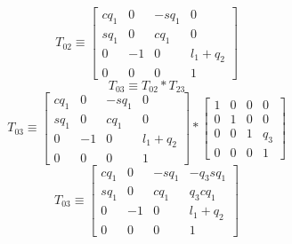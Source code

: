 \documentclass[12pt]{article}
\newcommand{\trans}[3]{\begin{bmatrix} 1 & 0 & 0 & #1 \\ 0 & 1 & 0 & #2 \\ 0 & 0 & 1 & #3 \\ 0 & 0 & 0 & 1 \end{bmatrix}}
\begin{document}
\[
  T_{02} \equiv
  \begin{bmatrix}
    cq_1 & 0 & -sq_1 & 0 \\
    sq_1 & 0 & cq_1 & 0 \\
    0 & -1 & 0 & l_1 + q_2 \\
    0 & 0 & 0 & 1
  \end{bmatrix}
\]
\[
  T_{03} \equiv T_{02} * T_{23}
\]
\[
  T_{03} \equiv
  \begin{bmatrix}
    cq_1 & 0 & -sq_1 & 0 \\
    sq_1 & 0 & cq_1 & 0 \\
    0 & -1 & 0 & l_1 + q_2 \\
    0 & 0 & 0 & 1
  \end{bmatrix}
  *
  \trans{0}{0}{q_3}
\]
\[
  T_{03} \equiv
  \begin{bmatrix}
    cq_1 & 0 & -sq_1 & -q_3sq_1 \\
    sq_1 & 0 &  cq_1 &  q_3cq_1 \\
    0 & -1 & 0 & l_1 + q_2 \\
    0 & 0 & 0 & 1
  \end{bmatrix}
\]
\end{document}
